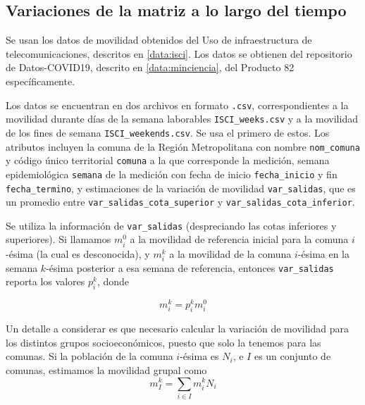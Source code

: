 



\subsection{Variaciones de la matriz a lo largo del tiempo} 

Se usan los datos de movilidad obtenidos del Uso de infraestructura de telecomunicaciones, descritos en \ref{data:isci}. Los datos se obtienen del repositorio de Datos-COVID19, descrito en \ref{data:minciencia}, del Producto 82 específicamente. 

Los datos se encuentran en dos archivos en formato \texttt{.csv}, correspondientes a la movilidad durante días de la semana laborables \texttt{ISCI\_weeks.csv} y a la movilidad de los fines de semana \texttt{ISCI\_weekends.csv}. Se usa el primero de estos. Los atributos incluyen la comuna de la Región Metropolitana con nombre \texttt{nom\_comuna} y código único territorial \texttt{comuna} a la que corresponde la medición, semana epidemiológica \texttt{semana} de la medición con fecha de inicio \texttt{fecha\_inicio} y fin \texttt{fecha\_termino}, y estimaciones de la variación de movilidad \texttt{var\_salidas}, que es un promedio entre \texttt{var\_salidas\_cota\_superior} y \texttt{var\_salidas\_cota\_inferior}. 

Se utiliza la información de \texttt{var\_salidas} (despreciando las cotas inferiores y superiores). Si llamamos \(m_i^0\) a la movilidad de referencia inicial para la comuna \(i\)-ésima (la cual es desconocida), y \(m_i^k\) a la movilidad de la comuna \(i\)-ésima en la semana \(k\)-ésima posterior a esa semana de referencia, entonces \texttt{var\_salidas} reporta los valores \(p_i^k\), donde 

\[
m_i^k = p_i^k m_i^0
\]

Un detalle a considerar es que necesario calcular la variación de movilidad para los distintos grupos socioeconómicos, puesto que solo la tenemos para las comunas. Si la población de la comuna \(i\)-ésima es \(N_i\), e \(I\) es un conjunto de comunas, estimamos la movilidad grupal como 
\[
m^k_I = \sum_{i \in I}m^k_i N_i
\]

